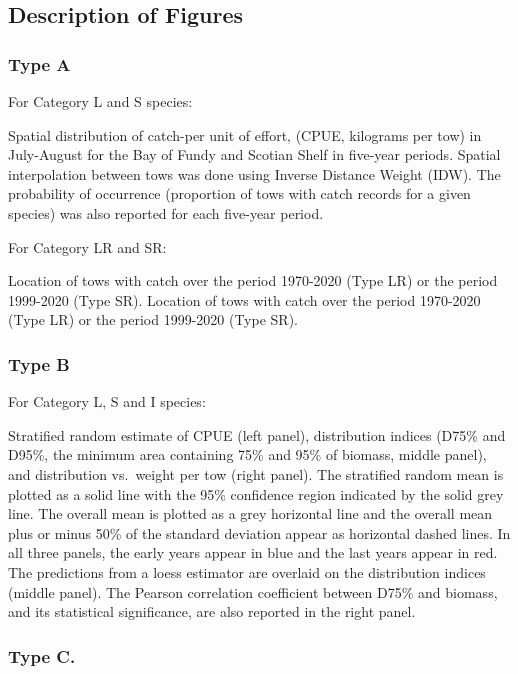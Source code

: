 \documentclass[12pt]{article}\usepackage[]{graphicx}\usepackage[]{color}
\begin{document}
\hypertarget{description-of-figures}{%
\subsection{Description of Figures}\label{description-of-figures}}

\hypertarget{type-a}{%
\subsubsection{Type A}\label{type-a}}

For Category L and S species:

Spatial distribution of catch-per unit of effort, (CPUE, kilograms per tow) in July-August for the Bay of Fundy and Scotian Shelf in five-year periods. Spatial interpolation between tows was done using Inverse Distance Weight (IDW). The probability of occurrence (proportion of tows with catch records for a given species) was also reported for each five-year period.

For Category LR and SR:

Location of tows with catch over the period 1970-2020 (Type LR) or the period 1999-2020 (Type SR). Location of tows with catch over the period 1970-2020 (Type LR) or the period 1999-2020 (Type SR).

\hypertarget{type-b}{%
\subsubsection{Type B}\label{type-b}}

For Category L, S and I species:

Stratified random estimate of CPUE (left panel), distribution indices (D75\% and D95\%, the minimum area containing 75\% and 95\% of biomass, middle panel), and distribution vs.~weight per tow (right panel). The stratified random mean is plotted as a solid line with the 95\% confidence region indicated by the solid grey line. The overall mean is plotted as a grey horizontal line and the overall mean plus or minus 50\% of the standard deviation appear as horizontal dashed lines. In all three panels, the early years appear in blue and the last years appear in red. The predictions from a loess estimator are overlaid on the distribution indices (middle panel). The Pearson correlation coefficient between D75\% and biomass, and its statistical significance, are also reported in the right panel.

\hypertarget{type-c.}{%
\subsubsection{Type C.}\label{type-c.}}
\end{document}
